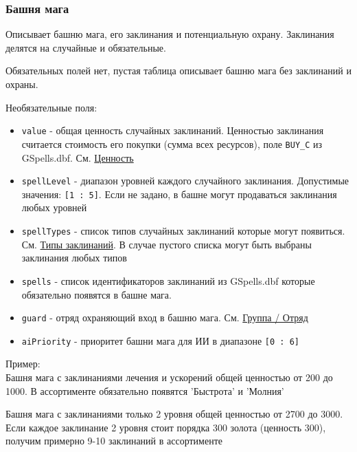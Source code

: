 \subsubsection{Башня мага}
\label{mage}
Описывает башню мага, его заклинания и потенциальную охрану. Заклинания делятся на случайные и обязательные.

Обязательных полей нет, пустая таблица описывает башню мага без заклинаний и охраны.

Необязательные поля:
\begin{itemize}
\item \texttt{value} - общая ценность случайных заклинаний. Ценностью заклинания считается стоимость его покупки (сумма всех ресурсов), поле \texttt{BUY\_C} из GSpells.dbf.  См. \hyperref[value]{Ценность}
\item \texttt{spellLevel} - диапазон уровней каждого случайного заклинания. Допустимые значения: \texttt{[1 : 5]}. Если не задано, в башне могут продаваться заклинания любых уровней
\item \texttt{spellTypes} - список типов случайных заклинаний которые могут появиться. См. \hyperref[spellTypes]{Типы заклинаний}. В случае пустого списка могут быть выбраны заклинания любых типов
\item \texttt{spells} - список идентификаторов заклинаний из GSpells.dbf которые обязательно появятся в башне мага.
\item \texttt{guard} - отряд охраняющий вход в башню мага. См. \hyperref[group]{Группа / Отряд}
\item \texttt{aiPriority} - приоритет башни мага для ИИ в диапазоне \texttt{[0 : 6]}
\end{itemize}

Пример:\\
Башня мага с заклинаниями лечения и ускорений общей ценностью от 200 до 1000.
В ассортименте обязательно появятся 'Быстрота' и 'Молния'

\begin{figure}[H]

\end{figure}

Башня мага с заклинаниями только 2 уровня общей ценностью от 2700 до 3000.
Если каждое заклинание 2 уровня стоит порядка 300 золота (ценность 300),
получим примерно 9-10 заклинаний в ассортименте

\begin{figure}[H]

\end{figure}
